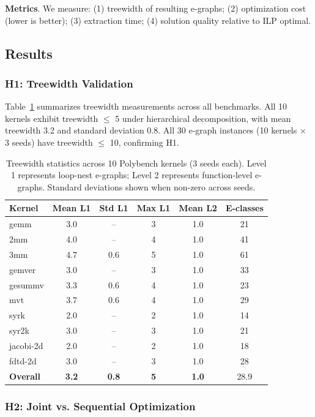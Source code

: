\documentclass[11pt]{article}
\begin{document}
\textbf{Metrics}. We measure: (1) treewidth of resulting e-graphs; (2) optimization cost (lower is better); (3) extraction time; (4) solution quality relative to ILP optimal.

\subsection{Results}

\subsubsection{H1: Treewidth Validation}

Table~\ref{tab:treewidth} summarizes treewidth measurements across all benchmarks. All 10 kernels exhibit treewidth $\leq$ 5 under hierarchical decomposition, with mean treewidth 3.2 and standard deviation 0.8. All 30 e-graph instances (10 kernels $\times$ 3 seeds) have treewidth $\leq$ 10, confirming H1.

\begin{table}[t]
\caption{Treewidth statistics across 10 Polybench kernels (3 seeds each). Level 1 represents loop-nest e-graphs; Level 2 represents function-level e-graphs. Standard deviations shown when non-zero across seeds.}
\label{tab:treewidth}
\centering
\begin{tabular}{lccccc}
\toprule
Kernel & Mean L1 & Std L1 & Max L1 & Mean L2 & E-classes \\
\midrule
gemm & 3.0 & -- & 3 & 1.0 & 21 \\
2mm & 4.0 & -- & 4 & 1.0 & 41 \\
3mm & 4.7 & 0.6 & 5 & 1.0 & 61 \\
gemver & 3.0 & -- & 3 & 1.0 & 33 \\
gesummv & 3.3 & 0.6 & 4 & 1.0 & 23 \\
mvt & 3.7 & 0.6 & 4 & 1.0 & 29 \\
syrk & 2.0 & -- & 2 & 1.0 & 14 \\
syr2k & 3.0 & -- & 3 & 1.0 & 21 \\
jacobi-2d & 2.0 & -- & 2 & 1.0 & 18 \\
fdtd-2d & 3.0 & -- & 3 & 1.0 & 28 \\
\midrule
\textbf{Overall} & \textbf{3.2} & \textbf{0.8} & \textbf{5} & \textbf{1.0} & 28.9 \\
\bottomrule
\end{tabular}
\end{table}

\subsubsection{H2: Joint vs. Sequential Optimization}
\label{sec:joint_vs_seq}
\end{document}
